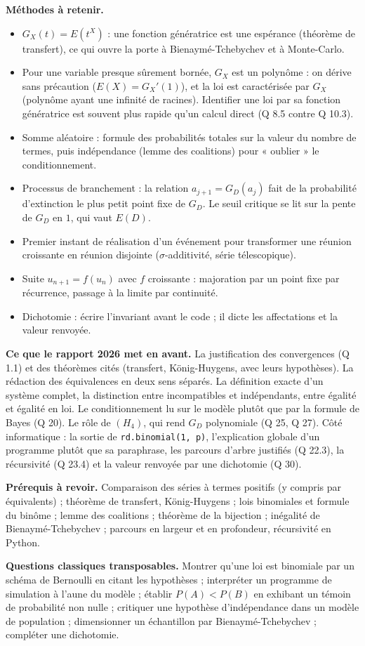 \documentclass[11pt,a4paper]{article}
\begin{document}
\textbf{Méthodes à retenir.}

\begin{itemize}
\item
  \(G_X(t)=E(t^X)\) : une fonction génératrice est une espérance (théorème de transfert), ce qui ouvre la porte à Bienaymé-Tchebychev et à Monte-Carlo.
\item
  Pour une variable presque sûrement bornée, \(G_X\) est un polynôme : on dérive sans précaution (\(E(X)=G_X'(1)\)), et la loi est caractérisée par \(G_X\) (polynôme ayant une infinité de racines). Identifier une loi par sa fonction génératrice est souvent plus rapide qu'un calcul direct (Q 8.5 contre Q 10.3).
\item
  Somme aléatoire : formule des probabilités totales sur la valeur du nombre de termes, puis indépendance (lemme des coalitions) pour « oublier » le conditionnement.
\item
  Processus de branchement : la relation \(a_{j+1}=G_D(a_j)\) fait de la probabilité d'extinction le plus petit point fixe de \(G_D\). Le seuil critique se lit sur la pente de \(G_D\) en \(1\), qui vaut \(E(D)\).
\item
  Premier instant de réalisation d'un événement pour transformer une réunion croissante en réunion disjointe (\(\sigma\)-additivité, série télescopique).
\item
  Suite \(u_{n+1}=f(u_n)\) avec \(f\) croissante : majoration par un point fixe par récurrence, passage à la limite par continuité.
\item
  Dichotomie : écrire l'invariant avant le code ; il dicte les affectations et la valeur renvoyée.
\end{itemize}

\textbf{Ce que le rapport 2026 met en avant.} La justification des convergences (Q 1.1) et des théorèmes cités (transfert, König-Huygens, avec leurs hypothèses). La rédaction des équivalences en deux sens séparés. La définition exacte d'un système complet, la distinction entre incompatibles et indépendants, entre égalité et égalité en loi. Le conditionnement lu sur le modèle plutôt que par la formule de Bayes (Q 20). Le rôle de \((H_4)\), qui rend \(G_D\) polynomiale (Q 25, Q 27). Côté informatique : la sortie de \texttt{rd.binomial(\allowbreak{}1,\allowbreak{}\ p)\allowbreak{}}, l'explication globale d'un programme plutôt que sa paraphrase, les parcours d'arbre justifiés (Q 22.3), la récursivité (Q 23.4) et la valeur renvoyée par une dichotomie (Q 30).

\textbf{Prérequis à revoir.} Comparaison des séries à termes positifs (y compris par équivalents) ; théorème de transfert, König-Huygens ; lois binomiales et formule du binôme ; lemme des coalitions ; théorème de la bijection ; inégalité de Bienaymé-Tchebychev ; parcours en largeur et en profondeur, récursivité en Python.

\textbf{Questions classiques transposables.} Montrer qu'une loi est binomiale par un schéma de Bernoulli en citant les hypothèses ; interpréter un programme de simulation à l'aune du modèle ; établir \(P(A)<P(B)\) en exhibant un témoin de probabilité non nulle ; critiquer une hypothèse d'indépendance dans un modèle de population ; dimensionner un échantillon par Bienaymé-Tchebychev ; compléter une dichotomie.
\end{document}
